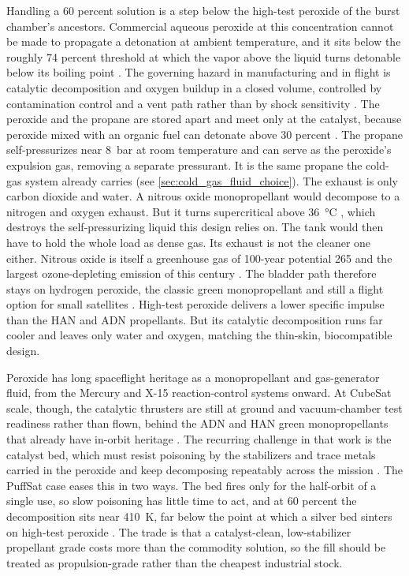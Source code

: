 \documentclass{article}
\begin{document}
Handling a 60 percent solution is a step below the high-test peroxide of the burst chamber's ancestors. Commercial aqueous peroxide at this concentration cannot be made to propagate a detonation at ambient temperature, and it sits below the roughly 74 percent threshold at which the vapor above the liquid turns detonable below its boiling point \cite{kopacz2022htp_oxidizer}. The governing hazard in manufacturing and in flight is catalytic decomposition and oxygen buildup in a closed volume, controlled by contamination control and a vent path rather than by shock sensitivity \cite{romantsova2015htp_safety}. The peroxide and the propane are stored apart and meet only at the catalyst, because peroxide mixed with an organic fuel can detonate above 30 percent \cite{kopacz2022htp_oxidizer}. The propane self-pressurizes near \SI{8}{\bar} at room temperature \cite{nist_webbook_propane} and can serve as the peroxide's expulsion gas, removing a separate pressurant. It is the same propane the cold-gas system already carries (see \autoref{sec:cold_gas_fluid_choice}). The exhaust is only carbon dioxide and water. A nitrous oxide monopropellant would decompose to a nitrogen and oxygen exhaust. But it turns supercritical above \SI{36}{\celsius} \cite{nist_webbook_n2o}, which destroys the self-pressurizing liquid this design relies on. The tank would then have to hold the whole load as dense gas. Its exhaust is not the cleaner one either. Nitrous oxide is itself a greenhouse gas of 100-year potential 265 \cite{ghgprotocol_gwp_values} and the largest ozone-depleting emission of this century \cite{ravishankara2009n2o}. The bladder path therefore stays on hydrogen peroxide, the classic green monopropellant and still a flight option for small satellites \cite{cassese2023htp}. High-test peroxide delivers a lower specific impulse than the HAN and ADN propellants. But its catalytic decomposition runs far cooler and leaves only water and oxygen, matching the thin-skin, biocompatible design.

Peroxide has long spaceflight heritage as a monopropellant and gas-generator fluid, from the Mercury and X-15 reaction-control systems onward. At CubeSat scale, though, the catalytic thrusters are still at ground and vacuum-chamber test readiness rather than flown, behind the ADN and HAN green monopropellants that already have in-orbit heritage \cite{pasini2025htp_cubesat,kopacz2022htp_oxidizer}. The recurring challenge in that work is the catalyst bed, which must resist poisoning by the stabilizers and trace metals carried in the peroxide and keep decomposing repeatably across the mission \cite{cervone2006htp_rockets}. The PuffSat case eases this in two ways. The bed fires only for the half-orbit of a single use, so slow poisoning has little time to act, and at 60 percent the decomposition sits near \SI{410}{\kelvin}, far below the point at which a silver bed sinters on high-test peroxide \cite{cervone2006htp_rockets}. The trade is that a catalyst-clean, low-stabilizer propellant grade costs more than the commodity solution, so the fill should be treated as propulsion-grade rather than the cheapest industrial stock.
\end{document}

